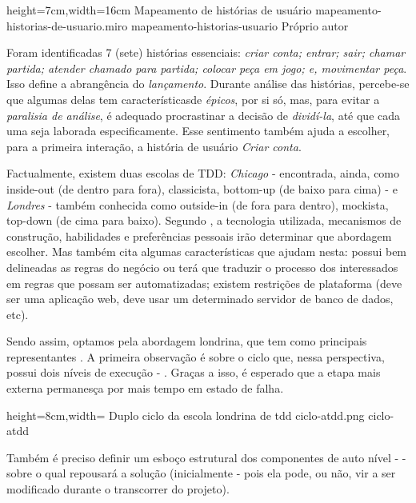   \imagem
    {height=7cm,width=16cm}
    {Mapeamento de histórias de usuário}
    {mapeamento-historias-de-usuario.miro}
    {mapeamento-historias-usuario}
    {Próprio autor\footnotemark}

  Foram identificadas 7 (sete) histórias essenciais: \emph{criar conta; entrar; sair; chamar partida; atender chamado para partida; colocar peça em jogo; e, movimentar peça}. Isso define a abrangência do \emph{lançamento}\cite[tradução nossa]{Beck2001}. Durante análise das histórias, percebe-se que algumas delas tem característicasde \emph{épicos}\cite[pág. 6, tradução nossa]{Cohn2004}, por si só, mas, para evitar a \emph{paralisia de análise}\cite[pág. 71, tradução nossa]{Pugh2011}, é adequado procrastinar a decisão de \emph{dividí-la}\cite[pág. 24, tradução nossa]{Cohn2004}, até que cada uma seja laborada especificamente. Esse sentimento também ajuda a escolher, para a primeira interação, a história de usuário \emph{Criar conta}.

  Factualmente, existem duas escolas de TDD: \emph{Chicago} - encontrada, ainda, como inside-out (de dentro para fora), classicista, bottom-up (de baixo para cima) - e \emph{Londres} - também conhecida como outside-in (de fora para dentro), mockista, top-down (de cima para baixo). Segundo , a tecnologia utilizada, mecanismos de construção, habilidades e preferências pessoais irão determinar que abordagem escolher. Mas também cita algumas características que ajudam nesta: possui bem delineadas as regras do negócio ou terá que traduzir o processo dos interessados em regras que possam ser automatizadas; existem restrições de plataforma (deve ser uma aplicação web, deve usar um determinado servidor de banco de dados, etc).

  Sendo assim, optamos pela abordagem londrina, que tem como principais representantes . A primeira observação é sobre o ciclo que, nessa perspectiva, possui dois níveis de execução - . Graças a isso, é esperado que a etapa mais externa permanesça por mais tempo em estado de falha.

  \imagem
    {height=8cm,width=\textwidth}
    {Duplo ciclo da escola londrina de tdd}
    {ciclo-atdd.png}
    {ciclo-atdd}
    {\cite[pág. 40, tradução nossa]{FreemanPryce2009}\footnotemark}

  Também é preciso definir um esboço estrutural dos componentes de auto nível -  - sobre o qual repousará a solução (inicialmente - pois ela pode, ou não, vir a ser modificado durante o transcorrer do projeto).

